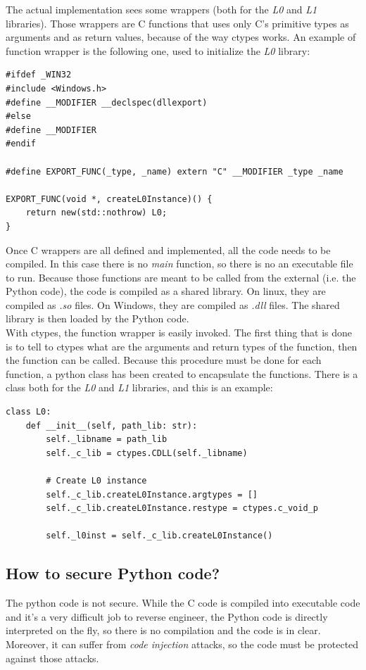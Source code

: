 The actual implementation sees some wrappers (both for the \textit{L0} and \textit{L1} libraries). Those wrappers are C functions that uses only C's primitive types as arguments and as return values, because of the way ctypes works. An example of function wrapper is the following one, used to initialize the \textit{L0} library:

\begin{lstlisting}[style=CStyle]
#ifdef _WIN32
#include <Windows.h>
#define __MODIFIER __declspec(dllexport)
#else
#define __MODIFIER 
#endif

#define EXPORT_FUNC(_type, _name) extern "C" __MODIFIER _type _name

EXPORT_FUNC(void *, createL0Instance)() {
    return new(std::nothrow) L0;
}

\end{lstlisting}

Once C wrappers are all defined and implemented, all the code needs to be compiled. In this case there is no \textit{main} function, so there is no an executable file to run. Because those functions are meant to be called from the external (i.e. the Python code), the code is compiled as a shared library. On linux, they are compiled as \textit{.so} files. On Windows, they are compiled as \textit{.dll} files. The shared library is then loaded by the Python code.\\

With ctypes, the function wrapper is easily invoked. The first thing that is done is to tell to ctypes what are the arguments and return types of the function, then the function can be called. Because this procedure must be done for each function, a python class has been created to encapsulate the functions. There is a class both for the \textit{L0} and \textit{L1} libraries, and this is an example:

\begin{lstlisting}[style=PyStyle]
class L0:
    def __init__(self, path_lib: str):
        self._libname = path_lib
        self._c_lib = ctypes.CDLL(self._libname)

        # Create L0 instance
        self._c_lib.createL0Instance.argtypes = []
        self._c_lib.createL0Instance.restype = ctypes.c_void_p

        self._l0inst = self._c_lib.createL0Instance()
\end{lstlisting}

\subsection{How to secure Python code?}
The python code is not secure. While the C code is compiled into executable code and it's a very difficult job to reverse engineer, the Python code is directly interpreted on the fly, so there is no compilation and the code is in clear. Moreover, it can suffer from \textit{code injection} attacks, so the code must be protected against those attacks.\\

